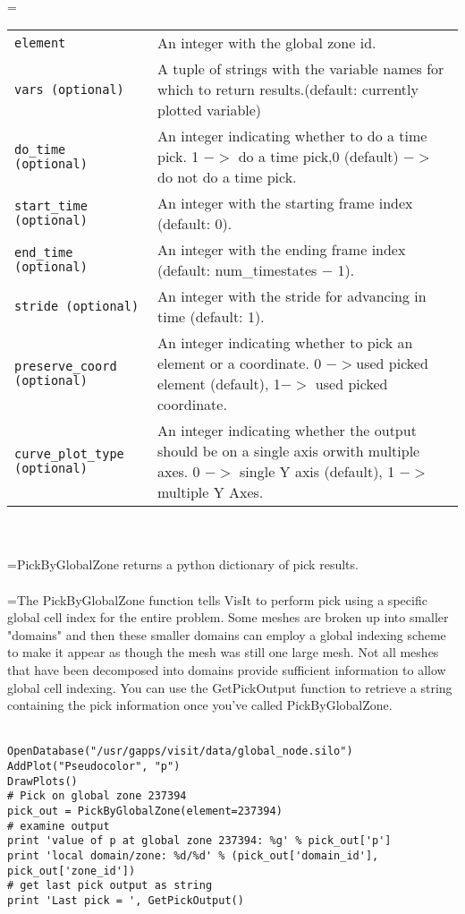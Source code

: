 \documentclass[10pt,a4paper]{report}
\begin{document}
 \\ 
\hangindent=\parindent 
\begin{tabular}{lp{9cm}}
\verb!element! & An integer with the global zone id. \\
\verb!vars (optional)! & A tuple of strings with the variable names for which to return results.(default: currently plotted variable) \\
\verb!do_time (optional)! & An integer indicating whether to do a time pick. 1 $-$$>$ do a time pick,0 (default) $-$$>$ do not do a time pick. \\
\verb!start_time (optional)! & An integer with the starting frame index (default: 0). \\
\verb!end_time (optional)! & An integer with the ending frame index (default: num\_timestates $-$ 1). \\
\verb!stride (optional)! & An integer with the stride for advancing in time (default: 1). \\
\verb!preserve_coord (optional)! & An integer indicating whether to pick an element or a coordinate. 0 $-$$>$used picked element (default), 1$-$$>$ used picked coordinate. \\
\verb!curve_plot_type (optional)! & An integer indicating whether the output should be on a single axis orwith multiple axes. 0 $-$$>$ single Y axis (default), 1 $-$$>$ multiple Y Axes. \\
\end{tabular} \\[-2mm]


 \\ 
\hangindent=\parindent PickByGlobalZone returns a python dictionary of pick results. \\[-3mm] 

 \\ 
\hangindent=\parindent The PickByGlobalZone function tells VisIt to perform pick using a specific global cell index for the entire problem. Some meshes are broken up into smaller "domains" and then these smaller domains can employ a global indexing scheme to make it appear as though the mesh was still one large mesh. Not all meshes that have been decomposed into domains provide sufficient information to allow global cell indexing. You can use the GetPickOutput function to retrieve a string containing the pick information once you've called PickByGlobalZone. \\[-3mm] 

\\[-6mm]
\begin{verbatim}OpenDatabase("/usr/gapps/visit/data/global_node.silo")
AddPlot("Pseudocolor", "p")
DrawPlots()
# Pick on global zone 237394
pick_out = PickByGlobalZone(element=237394)
# examine output
print 'value of p at global zone 237394: %g' % pick_out['p']
print 'local domain/zone: %d/%d' % (pick_out['domain_id'], pick_out['zone_id'])
# get last pick output as string
print 'Last pick = ', GetPickOutput()
\end{verbatim}
\newpage
\end{document}
